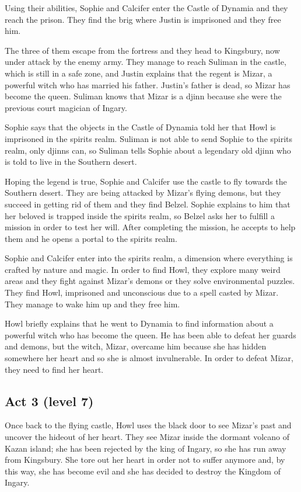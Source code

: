 Using their abilities, Sophie and Calcifer enter the Castle of Dynamia and they reach the prison. They find the brig where Justin is imprisoned and they free him.

The three of them escape from the fortress and they head to Kingsbury, now under attack by the enemy army. They manage to reach Suliman in the castle, which is still in a safe zone, and Justin explains that the regent is Mizar, a powerful witch who has married his father. Justin's father is dead, so Mizar has become the queen. Suliman knows that Mizar is a djinn because she were the previous court magician of Ingary.

Sophie says that the objects in the Castle of Dynamia told her that Howl is imprisoned in the spirits realm. Suliman is not able to send Sophie to the spirits realm, only djinns can, so Suliman tells Sophie about a legendary old djinn who is told to live in the Southern desert.

Hoping the legend is true, Sophie and Calcifer use the castle to fly towards the Southern desert. They are being attacked by Mizar's flying demons, but they succeed in getting rid of them and they find Belzel. Sophie explains to him that her beloved is trapped inside the spirits realm, so Belzel asks her to fulfill a mission in order to test her will. After completing the mission, he accepts to help them and he opens a portal to the spirits realm.

Sophie and Calcifer enter into the spirits realm, a dimension where everything is crafted by nature and magic. In order to find Howl, they explore many weird areas and they fight against Mizar's demons or they solve environmental puzzles. They find Howl, imprisoned and unconscious due to a spell casted by Mizar. They manage to wake him up and they free him.

Howl briefly explains that he went to Dynamia to find information about a powerful witch who has become the queen. He has been able to defeat her guards and demons, but the witch, Mizar, overcame him because she has hidden somewhere her heart and so she is almost invulnerable. In order to defeat Mizar, they need to find her heart.

\subsection*{Act 3 (level 7)}
Once back to the flying castle, Howl uses the black door to see Mizar's past and uncover the hideout of her heart. They see Mizar inside the dormant volcano of Kazan island; she has been rejected by the king of Ingary, so she has run away from Kingsbury. She tore out her heart in order not to suffer anymore and, by this way, she has become evil and she has decided to destroy the Kingdom of Ingary.

